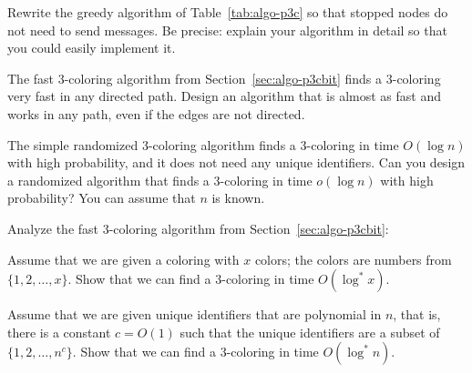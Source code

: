 \begin{ex}\label{ex:intro-stopped}
    Rewrite the greedy algorithm of Table~\ref{tab:algo-p3c} so that stopped nodes do not need to send messages. Be precise: explain your algorithm in detail so that you could easily implement it.
\end{ex}

\begin{ex}\label{ex:intro-undir-path}
    The fast 3-coloring algorithm from Section~\ref{sec:algo-p3cbit} finds a $3$-coloring very fast in any directed path. Design an algorithm that is almost as fast and works in any path, even if the edges are not directed.

\end{ex}

\begin{ex}
    The simple randomized 3-coloring algorithm finds a $3$-coloring in time $O(\log n)$ with high probability, and it does not need any unique identifiers. Can you design a randomized algorithm that finds a $3$-coloring in time $o(\log n)$ with high probability? You can assume that $n$ is known.

\end{ex}

\begin{ex}\label{ex:logstar}
    Analyze the fast 3-coloring algorithm from Section~\ref{sec:algo-p3cbit}:
    \begin{subex}
        \item Assume that we are given a coloring with $x$ colors; the colors are numbers from $\{1,2,\dotsc,x\}$. Show that we can find a $3$-coloring in time $O(\log^* x)$.
        \item Assume that we are given unique identifiers that are polynomial in $n$, that is, there is a constant $c = O(1)$ such that the unique identifiers are a subset of $\{1,2,\dotsc,n^c\}$. Show that we can find a $3$-coloring in time $O(\log^* n)$.
    \end{subex}
\end{ex}

